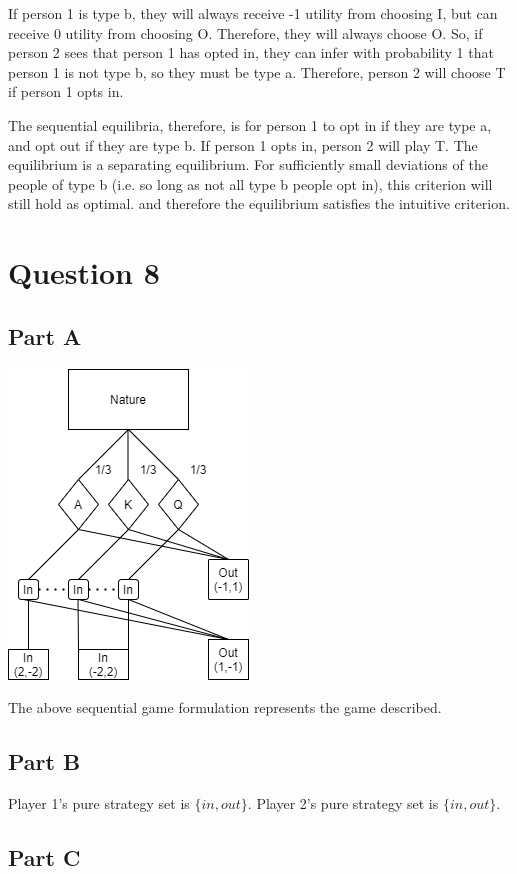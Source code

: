 \documentclass[11pt]{article} %
\begin{document}
If person 1 is type b, they will always receive -1 utility from choosing I, but can receive 0 utility from choosing O. Therefore, they will always choose O. So, if person 2 sees that person 1 has opted in, they can infer with probability 1 that person 1 is not type b, so they must be type a. Therefore, person 2 will choose T if person 1 opts in.

The sequential equilibria, therefore, is for person 1 to opt in if they are type a, and opt out if they are type b. If person 1 opts in, person 2 will play T. The equilibrium is a separating equilibrium. For sufficiently small deviations of the people of type b (i.e. so long as not all type b people opt in), this criterion will still hold as optimal. and therefore the equilibrium satisfies the intuitive criterion.
\section{Question 8}
\subsection{Part A}

\begin{center}
\includegraphics{diag}
\end{center}

The above sequential game formulation represents the game described. 
\subsection{Part B}
Player 1's pure strategy set is $\{in,out\}$. Player 2's pure strategy set is $\{in,out\}$.
\subsection{Part C}
\end{document}
